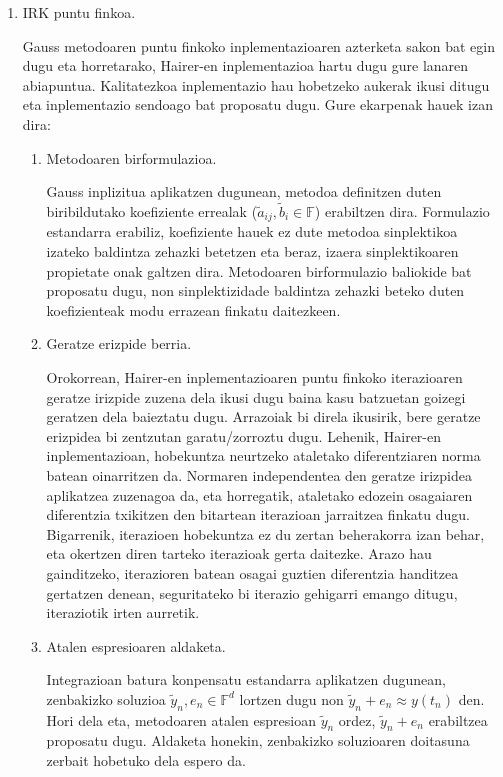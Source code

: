 \begin{enumerate}
\item IRK puntu finkoa.

Gauss metodoaren puntu finkoko inplementazioaren azterketa sakon bat egin dugu eta horretarako, Hairer-en inplementazioa \cite{Hairer2008} hartu dugu gure lanaren abiapuntua. Kalitatezkoa inplementazio hau hobetzeko aukerak ikusi ditugu eta inplementazio sendoago bat proposatu dugu. Gure ekarpenak hauek izan dira:  

\begin{enumerate}
\item Metodoaren birformulazioa.

Gauss inplizitua aplikatzen dugunean, metodoa definitzen duten biribildutako koefiziente errealak ($\tilde{a}_{ij}, \tilde{b}_i \in \mathbb{F}$) erabiltzen dira. Formulazio estandarra erabiliz, koefiziente hauek ez dute metodoa sinplektikoa izateko baldintza zehazki betetzen eta beraz, izaera sinplektikoaren propietate onak galtzen dira. Metodoaren birformulazio baliokide bat proposatu dugu, non sinplektizidade baldintza zehazki beteko duten koefizienteak modu errazean finkatu daitezkeen.

\item Geratze erizpide berria.

Orokorrean, Hairer-en inplementazioaren puntu finkoko iterazioaren geratze irizpide zuzena dela ikusi dugu baina kasu batzuetan goizegi geratzen dela baieztatu dugu. Arrazoiak bi direla ikusirik, bere geratze erizpidea bi zentzutan garatu/zorroztu dugu. Lehenik, Hairer-en inplementazioan, hobekuntza neurtzeko ataletako diferentziaren norma batean oinarritzen da. Normaren independentea den geratze irizpidea aplikatzea zuzenagoa da, eta horregatik, ataletako edozein osagaiaren diferentzia txikitzen den bitartean iterazioan jarraitzea finkatu dugu. Bigarrenik, iterazioen hobekuntza ez du zertan beherakorra izan behar, eta okertzen diren tarteko iterazioak gerta daitezke. Arazo hau gainditzeko, iterazioren batean osagai guztien diferentzia handitzea gertatzen denean, seguritateko bi iterazio gehigarri emango ditugu, iteraziotik irten aurretik.   

\item Atalen espresioaren aldaketa.

Integrazioan batura konpensatu estandarra aplikatzen dugunean, zenbakizko soluzioa $\tilde{y}_n, e_n \in \mathbb{F}^d$ lortzen dugu non $\tilde{y}_n+e_n \approx y(t_n)$ den. Hori dela eta, metodoaren atalen espresioan $\tilde{y}_n$ ordez, $\tilde{y}_n+e_n$ erabiltzea proposatu dugu. Aldaketa honekin, zenbakizko soluzioaren doitasuna zerbait hobetuko dela espero da.


\end{enumerate}
\end{enumerate}
